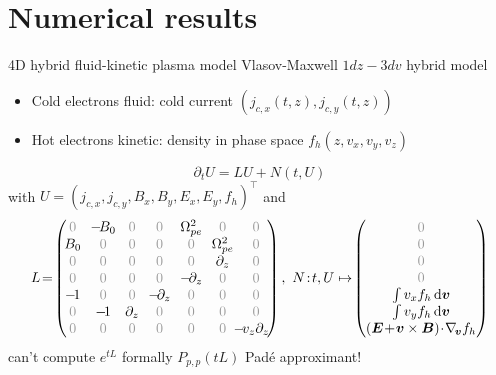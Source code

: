 \documentclass{beamer}
\newcommand{\cmark}{{\color{dgreen}\ding{52}}}
\newcommand{\xmark}{{\color{red}\ding{55}}}
\newcommand{\arrow}{{\color{PLB}\ding{220}}}
\newcommand{\Mvb}[1]{\boldsymbol{#1}}
\begin{document}
\section{Numerical results}
\begin{frame}{4D hybrid fluid-kinetic plasma model}
  Vlasov-Maxwell $1dz-3dv$ hybrid model
  \begin{itemize}
    \item Cold electrons \arrow fluid: cold current $(j_{c,x}(t,z),j_{c,y}(t,z))$
    \item Hot electrons \arrow kinetic: density in phase space $f_h(z,v_x,v_y,v_z)$
  \end{itemize}

  $$
    \partial_t U = LU + N(t,U)
  $$
  with $U = (j_{c,x},j_{c,y},B_x,B_y,E_x,E_y,f_h)^\top$ and
  $$
    L \!=\!\begin{pmatrix}
      \gz      & \!-\!B_0\! & \gz            &  \gz              &  \!\Omega_{pe}^2\! & \gz               & \gz \\ 
      \!B_0\!  &  \gz       & \gz            &  \gz              &  \gz               & \!\Omega_{pe}^2\! & \gz \\
      \gz      &  \gz       & \gz            &  \gz              &  \gz               & \partial_z        & \gz \\ 
      \gz      &  \gz       & \gz            &  \gz              & \!-\!\partial_z\!  & \gz               & \gz \\ 
      \!-\!1\! &  \gz       & \gz            & \!-\!\partial_z\! &  \gz               & \gz               & \gz \\ 
      \gz      & \!-\!1\!   & \!\partial_z\! &  \gz              &  \gz               & \gz               & \gz \\ 
      \gz      &  \gz       & \gz            &  \gz              &  \gz               & \gz               & \!\!\!\!\!-\!v_z\partial_z\! \\ 
    \end{pmatrix}
    ,\ 
    N\!:\!t,U\mapsto\!\begin{pmatrix}
      \gz \\
      \gz \\
      \gz \\
      \gz \\
      \int v_xf_h\dd{\Mvb{v}} \\
      \int v_yf_h\dd{\Mvb{v}} \\
      (\Mvb{E}\!+\!\Mvb{v}\times\Mvb{B})\!\cdot\!\nabla_{\!\Mvb{v}}f_h
    \end{pmatrix}
  $$
  \xmark can't compute $e^{tL}$ formally \hfill \cmark $P_{p,p}(tL)$ Padé approximant!
\end{frame}
\end{document}
